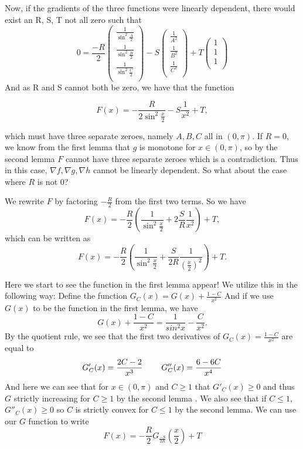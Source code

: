 \documentclass[12pt]{report}
\numberwithin{definition}{section}
\begin{document}
 Now, if the gradients of the three functions were linearly dependent, there would exist an R, S, T not all zero such that 
 \[
 	0 = \frac{-R}{2}
	\begin{pmatrix} 
	
	\frac{1}{\sin^2{\frac{A}{2}}} \\
	\frac{1}{\sin^2{\frac{B}{2}}} \\
	\frac{1}{\sin^2{\frac{C}{2}}} \\
	\end{pmatrix}
	-S
	\begin{pmatrix} 
	
	\frac{1}{A^2} \\
	\frac{1}{B^2} \\
	\frac{1}{C^2} \\
	\end{pmatrix}
	+ T 
	\begin{pmatrix} 
	
	1\\
	1 \\
	1\\
	\end{pmatrix}
 \]
 And as R and S cannot both be zero, we have that the function 

  \[
 	F(x) = -\frac{R}{2\sin^2{\frac{x}{2}}}-S\frac{1}{x^2}+T,
 \]
 
 which must have three separate zeroes, namely $A, B, C$ all in $(0, \pi )$. If $R = 0$, we know from the first lemma that $g$ is monotone for $ x \in (0, \pi)$, so by the second lemma $F$ cannot have three separate zeroes which is a contradiction. Thus in this case, $\nabla f, \nabla g, \nabla h$ cannot be linearly dependent. So what about the case where $R$ is not $0$? 

 
  	We rewrite $F$ by factoring  $- \frac {R}{2}$ from the first two terms. So we have 
\[ 
 	F(x)= -\frac{R}{2} ( \frac{1}{\sin^2{\frac{x}{2}}}+ 2\frac{S}{R}  \frac{1}{x^2})+T,
 \]
 which can be written as 
 \[ 
 	F(x)= -\frac{R}{2} ( \frac{1}{\sin^2{\frac{x}{2}}}+ \frac{S}{2R}  \frac{1}{(\frac{x}{2})^2})+T.
 \]
 
 
 Here we start to see the function in the first lemma appear! We utilize this in the following way: 
 Define the function $G_C(x) = G(x)+\frac{1-C}{x^2} $ And if we use $G(x)$ to be the function in the first lemma, we have 
 \[
 	G(x)+\frac{1-C}{x^2} = \frac{1}{sin^2{x}}-\frac{C}{x^2}.
\]
By the quotient rule, we see that the first two derivatives of $G_C(x) = \frac{1-C}{x^2}$ are equal to 
\[
G'_C(x) = \frac{2C-2}{x^3}     \hspace{8mm}         G''_C(x) = \frac{6-6C}{x^4} 
\]
 And here we can see that for $x\in (0, \pi)$ and $C\geq1$ that $G'_C(x)\geq0$ and thus $G$ strictly increasing for $C\geq1$ by the second lemma . We also see that if $C\leq1$,  $  G''_C(x) \geq0$ so $C$ is strictly convex for $C\leq1$ by the second lemma. We can use our $G$ function to write 
 \[
 F(x) = -\frac{R}{2}G_\frac{-S}{2R}(\frac{x}{2})+T
 \]
 
\end{document}
